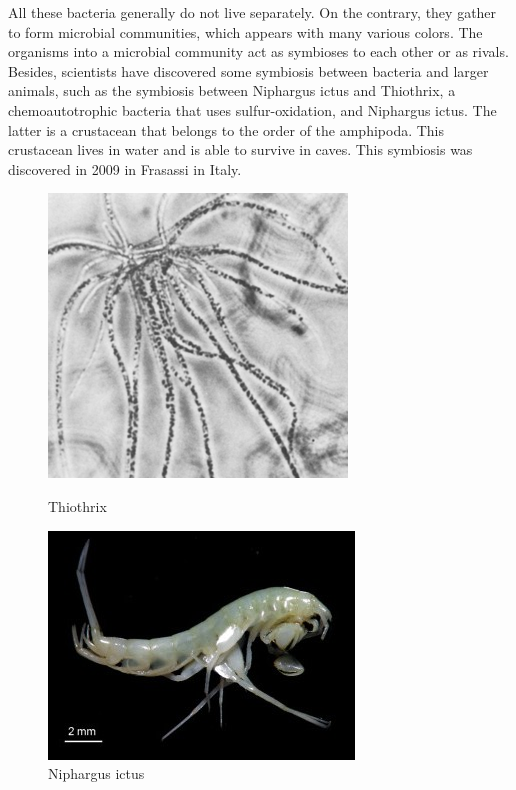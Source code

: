 \documentclass[draft, final]{report}
\begin{document}
All these bacteria generally do not live separately. On the contrary, they gather to form microbial communities, which appears with many various colors. The organisms into a microbial community act as symbioses to each other or as rivals. Besides, scientists have discovered some symbiosis between bacteria and larger animals, such as the symbiosis between Niphargus ictus and Thiothrix, a chemoautotrophic bacteria that uses sulfur-oxidation, and  Niphargus ictus. The latter is a crustacean that belongs to the order of the amphipoda. This crustacean lives in water and is able to survive in caves. This symbiosis was discovered in 2009 in Frasassi in Italy.
\begin{figure}[!ht]
    \begin{minipage}[c]{.46\linewidth}
        \centering
        \includegraphics[scale=0.7]{LateX/Images/thiothrix.png}
        \caption{Thiothrix\cite{thiothrix}}
    \end{minipage}
    \hfill%
    \begin{minipage}[c]{.46\linewidth}
        \centering
        \includegraphics[scale=0.7]{LateX/Images/niphargus.png}
        \caption{Niphargus ictus\cite{niphargus}}
    \end{minipage}
    \hfill%

\end{figure}
\end{document}
